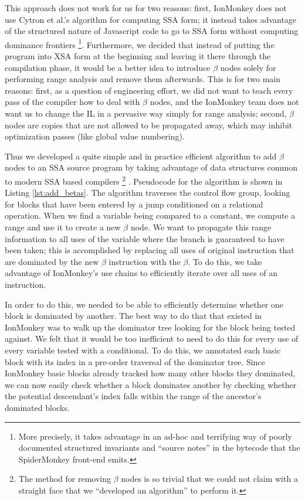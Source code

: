 \documentclass{article}
\begin{document}
This approach does not work for us for two reasons: first, IonMonkey
does not use Cytron et al.'s algorithm for computing SSA form; it
instead takes advantage of the structured nature of Javascript code to
go to SSA form without computing dominance frontiers \footnote{More
  precisely, it takes advantage in an ad-hoc and terrifying way of
  poorly documented structured invariants and ``source notes'' in the
  bytecode that the SpiderMonkey front-end emits.}.  Furthermore, we
decided that instead of putting the program into XSA form at the
beginning and leaving it there through the compilation phase, it would
be a better idea to introduce $\beta$ nodes solely for performing
range analysis and remove them afterwards. This is for two main
reasons: first, as a question of engineering effort, we did not want
to teach every pass of the compiler how to deal with $\beta$ nodes,
and the IonMonkey team does not want us to change the IL in a pervasive
way simply for range analysis; second, $\beta$ nodes are copies that
are not allowed to be propagated away, which may inhibit optimization
passes (like global value numbering).

Thus we developed a quite simple and in practice efficient algorithm to
add $\beta$ nodes to an SSA source program by taking
advantage of data structures common to modern SSA based compilers
\footnote{The method for removing $\beta$ nodes is so trivial that we
  could not claim with a straight face that we ``developed an
  algorithm'' to perform it.} .  Pseudocode for the algorithm is shown
in Listing \ref{lst:add_betas}. The algorithm traverses the control
flow group, looking for blocks that have been entered by a jump
conditioned on a relational operation. When we find a variable being
compared to a constant, we compute a range and use it to create a new
$\beta$ node. We want to propagate this range information to all uses
of the variable where the branch is guaranteed to have been taken;
this is accomplished by replacing all uses of original instruction
that are dominated by the new $\beta$ instruction with the $\beta$. To
do this, we take advantage of IonMonkey's use chains to efficiently
iterate over all uses of an instruction.

In order to do this, we needed to be able to efficiently determine
whether one block is dominated by another. The best way to do that
that existed in IonMonkey was to walk up the dominator tree looking
for the block being tested against. We felt that it would be too
inefficient to need to do this for every use of every variable tested
with a conditional. To do this, we annotated each basic block with its
index in a pre-order traversal of the dominator tree. Since IonMonkey
basic blocks already tracked how many other blocks they dominated, we
can now easily check whether a block dominates another by checking
whether the potential descendant's index falls within the range of the
ancestor's dominated blocks.
\end{document}
